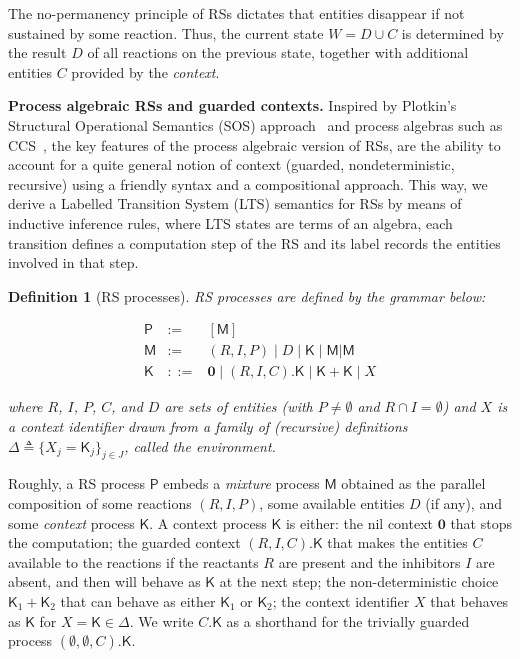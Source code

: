 \documentclass[sn-mathphys-num,a4paper,iicol,lineno,pdflatex]{sn-jnl-hacked}
\newcommand{\nil}{\mathbf{0}}
\theoremstyle{thmstyleone}%
\theoremstyle{thmstyletwo}%
\theoremstyle{thmstylethree}%
\newtheorem{definition}{Definition}%
\begin{document}
The no-permanency principle of RSs dictates that entities disappear if not sustained by some reaction.
Thus, the current state $W=D\cup C$ is determined by the result $D$ of all reactions on the previous state, together with additional entities $C$ provided by the \emph{context}. 

\medskip
\noindent
\textbf{Process algebraic RSs and guarded contexts.}
Inspired by Plotkin's Structural Operational Semantics (SOS) approach~\cite{DBLP:journals/jlp/Plotkin04a} and process algebras such as CCS~\cite{Milner80}, the key features of the process algebraic version of RSs, are the ability to account for a quite general notion of context (guarded, nondeterministic, recursive) using a friendly syntax and a compositional approach. This way, we derive a Labelled Transition System (LTS) semantics for RSs by means of inductive inference rules, where LTS states are terms of an algebra, each transition defines a computation step of the RS and its label records the entities involved in that step.

\begin{definition}[RS processes]\label{def:LTSforRS}
\emph{RS processes} are defined by the grammar below:

\begin{eqnarray*}
\mathsf{P} & := & [\mathsf{M}]
\\
\mathsf{M} & := & (R,I,P) \mid D \mid \mathsf{K} \mid \mathsf{M}|\mathsf{M}
\\
\mathsf{K} & ::= & \nil \mid (R,I,C).\mathsf{K} \mid \mathsf{K}+\mathsf{K} \mid X
\end{eqnarray*}

\noindent
where $R$, $I$, $P$, $C$, and $D$ are sets of entities (with $P\neq \emptyset$ and $R\cap I=\emptyset$) and $X$ is a context identifier drawn from a family of (recursive) definitions $\Delta \triangleq\{X_j=\mathsf{K}_j\}_{j\in J}$, called the \emph{environment}.
\end{definition}

Roughly, a RS process  $\mathsf{P}$ embeds a \emph{mixture} process $\mathsf{M}$ obtained as the parallel composition of some reactions $(R,I,P)$, some available entities $D$ (if any), and some \emph{context} process $\mathsf{K}$.
A  context process $\mathsf{K}$ is either: 
the nil context $\nil$ that stops the computation;
the guarded context $(R,I,C).\mathsf{K}$ that makes the entities $C$ available to the reactions if the reactants $R$ are present and the inhibitors $I$ are absent, and then will behave as $\mathsf{K}$ at the next step;
the non-deterministic choice $\mathsf{K}_1+\mathsf{K}_2$ that can behave as either  $\mathsf{K}_1$ or $\mathsf{K}_2$;  
the context identifier $X$ that behaves as $\mathsf{K}$ for $X=\mathsf{K}\in \Delta$.
We write $C.\mathsf{K}$ as a shorthand for the trivially guarded process $(\emptyset,\emptyset,C).\mathsf{K}$.
\end{document}
